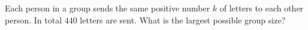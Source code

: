 Each person in a group sends the same positive number $k$ of letters to each other person. In total $440$ letters are sent. What is the largest possible group size?
